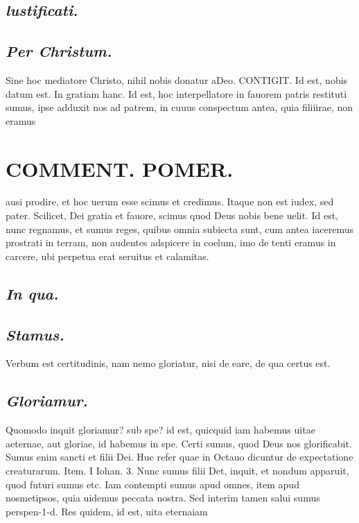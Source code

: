 \documentclass{article}
\begin{document}
\begin{pages}
\subsection*{\textit{lustificati. }}
{}
\subsection*{\textit{Per Christum. }}\pstart Sine hoc mediatore Christo, nihil nobis donatur aDeo. CONTIGIT. Id est, nobis datum est.   \pend\pstart In gratiam hanc. Id est, hoc interpellatore in fauorem patris restituti sumus, ipse adduxit nos ad patrem, in cuuus conspectum antea, quia filiiirae, non eramus  \pend
\section*{COMMENT. POMER.  }\pstart ausi prodire, et hoc uerum esse scimus et credimus. Itaque non est iudex, sed pater.  \pend\pstart Scilicet, Dei gratia et fauore, scimus quod Deus nobis bene uelit.   \pend\pstart Id est, nunc regnamus, et sumus reges, quibus omnia subiecta sunt, cum antea iaceremus prostrati in terram, non audentes adspicere in coelum, imo de tenti eramus in carcere, ubi perpetua erat seruitus et calamitas.   \pend
{}
{}
\subsection*{\textit{In qua. }}
{}
\subsection*{\textit{Stamus. }}\pstart Verbum est certitudinis, nam nemo gloriatur, nisi de eare, de qua certus est.   \pend
{}
{}
\subsection*{\textit{Gloriamur. }}\pstart Quomodo inquit gloriamur? sub spe? id est, quicquid iam habemus uitae aeternae, aut gloriae, id habemus in spe. Certi sumus, quod Deus nos glorificabit. Sumus enim sancti et filii Dei. Huc refer quae in Octauo dicuntur de expectatione creaturarum. Item. I Iohan. 3. Nunc sumus filii Det, inquit, et nondum apparuit, quod futuri sumus etc. Iam contempti sumus apud omnes, item apud nosmetipsos, quia uidemus peccata nostra. Sed interim tamen salui sumus perspen-1-d. Res quidem, id est, uita eternaiam  \pend
{}
{}

\end{pages}
\end{document}
